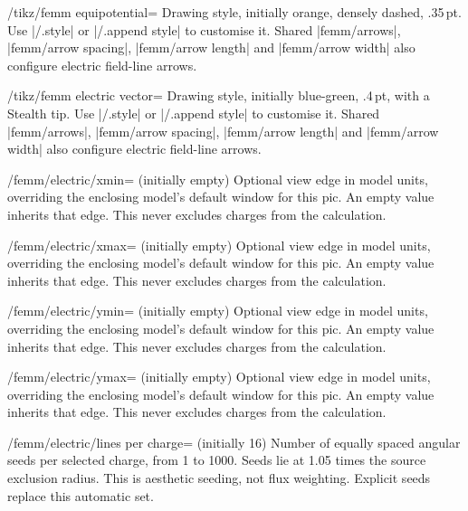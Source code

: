 \begin{key}{/tikz/femm equipotential=}
Drawing style, initially orange, densely dashed, .35\,pt. Use |/.style| or |/.append style| to customise it.
Shared |femm/arrows|, |femm/arrow spacing|, |femm/arrow length| and
|femm/arrow width| also configure electric field-line arrows.
\end{key}

\begin{key}{/tikz/femm electric vector=}
Drawing style, initially blue-green, .4\,pt, with a Stealth tip. Use |/.style| or |/.append style| to customise it.
Shared |femm/arrows|, |femm/arrow spacing|, |femm/arrow length| and
|femm/arrow width| also configure electric field-line arrows.
\end{key}

\begin{key}{/femm/electric/xmin= (initially \normalfont empty)}
Optional view edge in model units, overriding the enclosing model's default
window for this pic. An empty value inherits that edge. This never excludes
charges from the calculation.
\end{key}

\begin{key}{/femm/electric/xmax= (initially \normalfont empty)}
Optional view edge in model units, overriding the enclosing model's default
window for this pic. An empty value inherits that edge. This never excludes
charges from the calculation.
\end{key}

\begin{key}{/femm/electric/ymin= (initially \normalfont empty)}
Optional view edge in model units, overriding the enclosing model's default
window for this pic. An empty value inherits that edge. This never excludes
charges from the calculation.
\end{key}

\begin{key}{/femm/electric/ymax= (initially \normalfont empty)}
Optional view edge in model units, overriding the enclosing model's default
window for this pic. An empty value inherits that edge. This never excludes
charges from the calculation.
\end{key}

\begin{key}{/femm/electric/lines per charge= (initially 16)}
Number of equally spaced angular seeds per selected charge, from 1 to 1000.
Seeds lie at 1.05 times the source exclusion radius. This is aesthetic seeding,
not flux weighting. Explicit seeds replace this automatic set.
\end{key}


